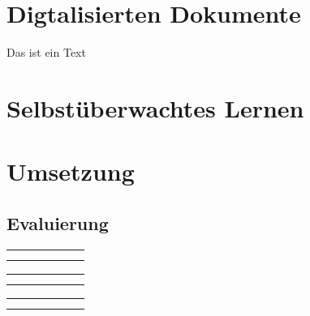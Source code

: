 \chapter{Digtalisierten Dokumente}
Das ist ein Text

\chapter{Selbstüberwachtes Lernen}


\chapter{Umsetzung}

\section{Evaluierung}


\newcommand{\resulttable}[2]{
    \begin{tabular}{l|r|r|r|r|r}%
        \hline
        \csvreader[head to column names, filter equal={\dataset}{#1}]{results/document_image_segmentation_results.csv}{}%
        {#2}
        \\\hline
        \end
        {tabular}
}

\resulttable{CB55}{\\ \name & \pixelacc & \FgPA & \meanacc & \meanIU & \fwIU}
\resulttable{CSG18}{\\  \pixelacc & \FgPA & \meanacc & \meanIU & \fwIU}
\resulttable{CSG863}{\\  \pixelacc & \FgPA & \meanacc & \meanIU & \fwIU}
